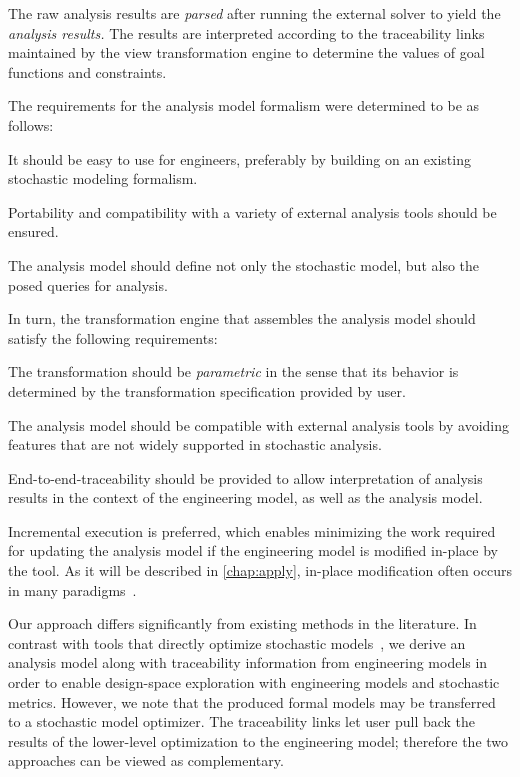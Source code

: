 The raw analysis results are \emph{parsed} after running the external solver to yield the \emph{analysis results.} The results are interpreted according to the traceability links maintained by the view transformation engine to determine the values of goal functions and constraints.

The requirements for the analysis model formalism were determined to be as follows:
\begin{enumerate*}
\item It should be easy to use for engineers, preferably by building on an existing stochastic modeling formalism.
\item Portability and compatibility with a variety of external analysis tools should be ensured.
\item The analysis model should define not only the stochastic model, but also the posed queries for analysis.
\end{enumerate*}

In turn, the transformation engine that assembles the analysis model should satisfy the following requirements:
\begin{enumerate*}
\item The transformation should be \emph{parametric} in the sense that its behavior is determined by the transformation specification provided by user.
\item The analysis model should be compatible with external analysis tools by avoiding features that are not widely supported in stochastic analysis.
\item End-to-end-traceability should be provided to allow interpretation of analysis results in the context of the engineering model, as well as the analysis model.
\item Incremental execution is preferred, which enables minimizing the work required for updating the analysis model if the engineering model is modified in-place by the  tool. As it will be described in \cref{chap:apply}, in-place modification often occurs in many  paradigms~\citep{Vanherpen14patterns}.
\end{enumerate*}

Our approach differs significantly from existing methods in the literature. In contrast with tools that directly optimize stochastic models~, we derive an analysis model along with traceability information from engineering models in order to enable design-space exploration with engineering models and stochastic metrics. However, we note that the produced formal models may be transferred to a stochastic model optimizer. The traceability links let user pull back the results of the lower-level optimization to the engineering model; therefore the two approaches can be viewed as complementary.

